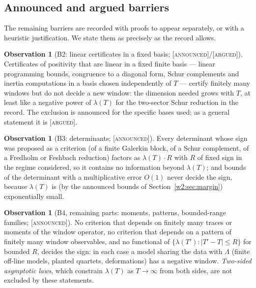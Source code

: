 \documentclass[11pt]{amsart}
\theoremstyle{definition}
\newtheorem{observation}[theorem]{Observation}
\theoremstyle{remark}
\numberwithin{equation}{section}
\newcommand{\lam}{\lambda(T)}                          %
\newcommand{\stag}[1]{\textsc{[#1]}}
\newcommand{\ARGUED}{\stag{argued}}
\newcommand{\ANNOUNCED}{\stag{announced}}
\begin{document}
\subsection{Announced and argued barriers}\label{w3:subsec:announced}

The remaining barriers are recorded with proofs to appear separately, or with a
heuristic justification. We state them as precisely as the record allows.

\begin{observation}[B2: linear certificates in a fixed basis; \ANNOUNCED/\ARGUED]\label{w3:bar:B2}
Certificates of positivity that are linear in a fixed finite basis --- linear programming bounds,
congruence to a diagonal form, Schur complements and inertia computations in a basis chosen independently of
$T$ --- certify finitely many windows but do not decide a new window: the dimension needed grows with
$T$, at least like a negative power of $\lam$ for the two-sector Schur reduction in the record. The exclusion
is announced for the specific bases used; as a general statement it is \ARGUED.
\end{observation}

\begin{observation}[B3: determinants; \ANNOUNCED]\label{w3:bar:B3}
Every determinant whose sign was proposed as a criterion (of a finite Galerkin block, of a Schur complement, of
a Fredholm or Feshbach reduction) factors as $\lam\cdot R$ with $R$ of fixed sign in the regime considered, so it
contains no information beyond $\lam$; and bounds of the determinant with a multiplicative error $O(1)$ never
decide the sign, because $\lam$ is (by the announced bounds of Section~\ref{w2:sec:margin}) exponentially small.
\end{observation}

\begin{observation}[B4, remaining parts: moments, patterns, bounded-range families; \ANNOUNCED]\label{w3:bar:B4b}
No criterion that depends on finitely many traces or moments of the window operator, no criterion that depends
on a pattern of finitely many window observables, and no functional of $\{\lambda(T'):|T'-T|\le R\}$ for bounded
$R$, decides the sign: in each case a model sharing the data with $\Lambda$ (finite off-line models, planted
quartets, deformations) has a negative window. \emph{Two-sided asymptotic laws}, which constrain
$\lambda(T)$ as $T\to\infty$ from both sides, are not excluded by these statements.
\end{observation}
\end{document}

